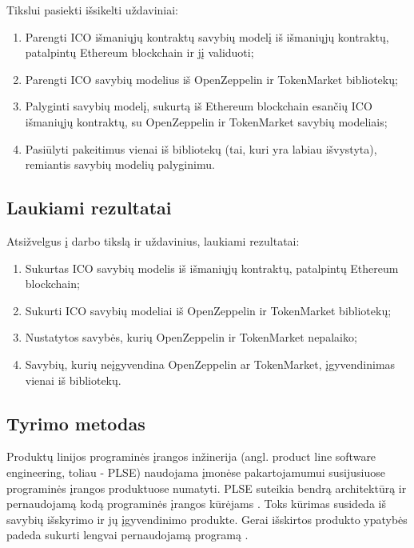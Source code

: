 \documentclass{VUMIFPSbakalaurinis}
\begin{document}
Tikslui pasiekti išsikelti uždaviniai:
\begin{enumerate}[topsep=0pt,itemsep=-1ex,partopsep=1ex,parsep=1ex]
\item Parengti ICO išmaniųjų kontraktų savybių modelį iš išmaniųjų kontraktų, patalpintų Ethereum blockchain ir jį validuoti;
\item Parengti ICO savybių modelius iš OpenZeppelin ir TokenMarket bibliotekų;
\item Palyginti savybių modelį, sukurtą iš Ethereum blockchain esančių ICO išmaniųjų kontraktų, su OpenZeppelin ir TokenMarket savybių modeliais;
\item Pasiūlyti pakeitimus vienai iš bibliotekų (tai, kuri yra labiau išvystyta), remiantis savybių modelių palyginimu.
\end{enumerate}

\subsection{Laukiami rezultatai}

Atsižvelgus į darbo tikslą ir uždavinius, laukiami rezultatai:
\begin{enumerate}[topsep=0pt,itemsep=-1ex,partopsep=1ex,parsep=1ex]
\item Sukurtas ICO savybių modelis iš išmaniųjų kontraktų, patalpintų Ethereum blockchain;
\item Sukurti ICO savybių modeliai iš OpenZeppelin ir TokenMarket  bibliotekų;
\item Nustatytos savybės, kurių OpenZeppelin ir TokenMarket nepalaiko;
\item Savybių, kurių neįgyvendina OpenZeppelin ar TokenMarket, įgyvendinimas vienai iš bibliotekų.

\end{enumerate}


\subsection{Tyrimo metodas}

Produktų linijos programinės įrangos inžinerija (angl. product line software engineering, toliau - PLSE) naudojama įmonėse pakartojamumui susijusiuose programinės įrangos produktuose numatyti. PLSE suteikia bendrą architektūrą ir pernaudojamą kodą programinės įrangos kūrėjams \cite{Svahnberg}. Toks kūrimas susideda iš savybių išskyrimo ir jų įgyvendinimo produkte. Gerai išskirtos produkto ypatybės padeda sukurti lengvai pernaudojamą programą \cite{Lee2015}.
\end{document}
